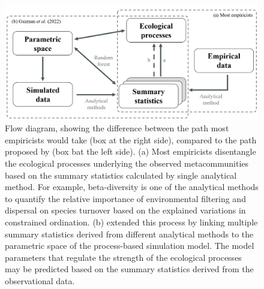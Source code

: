 \begin{figure}
	\centering
	\includegraphics[width=\linewidth]{./figures/ppt/framework.png}
	\caption[Difference between the path most empiricists would take with the path proposed by \citet{guzman2022accounting}.]{\small
		Flow diagram, showing the difference between the path most empiricists would take (box \DIFaddbeginFL {}\DIFaddendFL at the right side), compared to the path proposed by \citet{guzman2022accounting} (box \DIFaddbeginFL \DIFaddFL{(}\DIFaddendFL b\DIFaddbeginFL \DIFaddFL{) }\DIFaddendFL at the left side). (a) Most empiricists disentangle the ecological processes underlying the observed metacommunities based on the summary statistics calculated by \DIFaddbeginFL {}\DIFaddendFL single analytical method. For example, beta-diversity is one of the analytical methods to quantify the relative importance of environmental filtering and dispersal on species turnover based on the explained variations in constrained ordination. (b) \citet{guzman2022accounting} extended this process by linking multiple summary statistics derived from different analytical methods to the parametric space of the process-based simulation model. The model parameters that regulate the strength of the ecological processes may be predicted based on the summary statistics derived from the observational data.}
	\label{fig:framework}
\end{figure}


